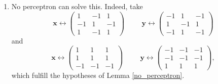 \documentclass[12pt]{amsart}
\newcommand{\mbf}[1]{\mathbf{#1}}
\theoremstyle{remark}
\begin{document}
\begin{enumerate}
\item No perceptron can solve this. Indeed, take 
\[
\mbf{x} \leftrightarrow \begin{pmatrix} 1 & -1 & 1 \\ -1 & 1 & -1 \\ 1 & -1 & 1 \end{pmatrix} \hspace{1cm} \mbf{y} \leftrightarrow \begin{pmatrix} -1 & 1 & -1 \\ 1 & -1 & 1 \\ -1 & 1 & -1 \end{pmatrix} 
\]
 and  
\[
\mbf{x} \leftrightarrow \begin{pmatrix} 1 & 1 & 1 \\ 1 & 1 & 1 \\ -1 & -1 & -1 \end{pmatrix} \hspace{1cm} \mbf{y} \leftrightarrow \begin{pmatrix} -1 & -1 & -1 \\ -1 & -1 & -1 \\ 1 & 1 & 1 \end{pmatrix} ,
\]
which fulfill the hypotheses of Lemma \ref{no_perceptron}.
\end{enumerate}
\end{document}
